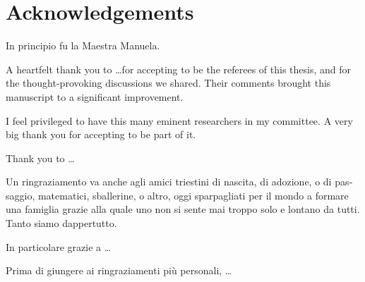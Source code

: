  
\chapter*{Acknowledgements}
\label{C:Acknowledgements}


\begin{otherlanguage}{italian}
In principio fu la Maestra Manuela. 
\end{otherlanguage}


\medskip


A heartfelt thank you to \ldots for accepting to be the referees of this thesis, and for the thought-provoking discussions we shared.  Their comments brought this manuscript to a significant improvement. 


\medskip

I feel privileged to have this many eminent researchers in my committee. A very big thank you for accepting to be part of it. 

Thank you to \ldots

\medskip

\begin{otherlanguage}{italian}

Un ringraziamento va anche agli amici triestini di nascita, di adozione, o di passaggio, matematici, sballerine, o altro, oggi sparpagliati per il mondo a formare una famiglia grazie alla quale uno non si sente mai troppo solo e lontano da tutti. Tanto siamo dappertutto. 

In particolare grazie a \ldots

\medskip

Prima di giungere ai ringraziamenti più personali, \ldots
\end{otherlanguage}
